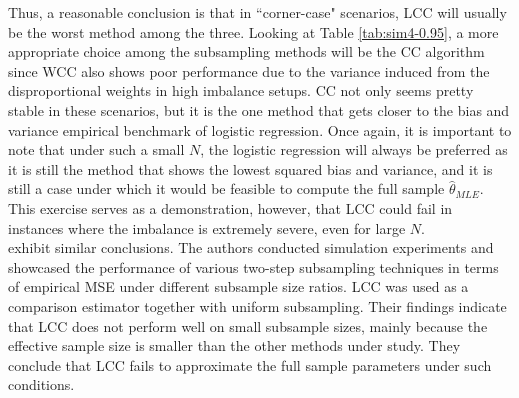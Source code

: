 Thus, a reasonable conclusion is that in ``corner-case" scenarios, LCC will usually be the worst method among the three. Looking at Table \ref{tab:sim4-0.95}, a more appropriate choice among the subsampling methods will be the CC algorithm since WCC also shows poor performance due to the variance induced from the disproportional weights in high imbalance setups. CC not only seems pretty stable in these scenarios, but it is the one method that gets closer to the bias and variance empirical benchmark of logistic regression. Once again, it is important to note that under such a small $N$, the logistic regression will always be preferred as it is still the method that shows the lowest squared bias and variance, and it is still a case under which it would be feasible to compute the full sample $\hat{\theta}_{MLE}$. This exercise serves as a demonstration, however, that LCC could fail in instances where the imbalance is extremely severe, even for large $N$. \\

\textcite{wang2018optimal} exhibit similar conclusions. The authors conducted simulation experiments and showcased the performance of various two-step subsampling techniques in terms of empirical MSE under different subsample size ratios. LCC was used as a comparison estimator together with uniform subsampling. Their findings indicate that LCC does not perform well on small subsample sizes, mainly because the effective sample size is smaller than the other methods under study. They conclude that LCC fails to approximate the full sample parameters under such conditions.



















    






